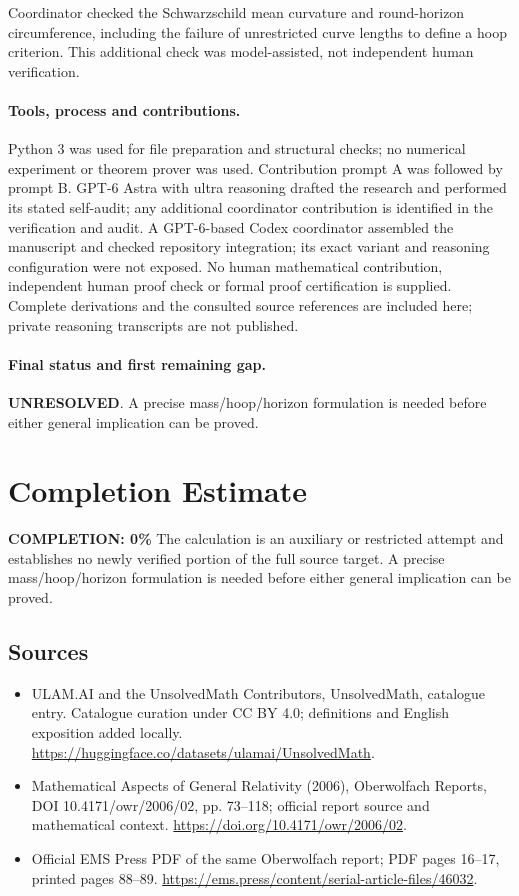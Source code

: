 \documentclass[11pt]{article}
\begin{document}
Coordinator checked the Schwarzschild mean curvature and round-horizon circumference, including the failure of unrestricted curve lengths to define a hoop criterion. This additional check was model-assisted, not independent human verification.

\paragraph{Tools, process and contributions.}
Python 3 was used for file preparation and structural checks; no numerical experiment or theorem prover was used. Contribution prompt A was followed by prompt B. GPT-6 Astra with ultra reasoning drafted the research and performed its stated self-audit; any additional coordinator contribution is identified in the verification and audit. A GPT-6-based Codex coordinator assembled the manuscript and checked repository integration; its exact variant and reasoning configuration were not exposed. No human mathematical contribution, independent human proof check or formal proof certification is supplied. Complete derivations and the consulted source references are included here; private reasoning transcripts are not published.

\paragraph{Final status and first remaining gap.}
\textbf{UNRESOLVED}. A precise mass/hoop/horizon formulation is needed before either general implication can be proved.

\section{Completion Estimate}
\noindent\textbf{COMPLETION: 0\%}
The calculation is an auxiliary or restricted attempt and establishes no newly verified portion of the full source target. A precise mass/hoop/horizon formulation is needed before either general implication can be proved.

\subsection{Sources}
\begin{itemize}
\item[\hypertarget{source:statement:1}{S1}] ULAM.AI and the UnsolvedMath Contributors, UnsolvedMath, catalogue entry. Catalogue curation under CC BY 4.0; definitions and English exposition added locally.
\url{https://huggingface.co/datasets/ulamai/UnsolvedMath}.
\item[\hypertarget{source:statement:2}{S2}] Mathematical Aspects of General Relativity (2006), Oberwolfach Reports, DOI 10.4171/owr/2006/02, pp. 73--118; official report source and mathematical context.
\url{https://doi.org/10.4171/owr/2006/02}.
\item[\hypertarget{source:statement:3}{S3}] Official EMS Press PDF of the same Oberwolfach report; PDF pages 16--17, printed pages 88--89.
\url{https://ems.press/content/serial-article-files/46032}.
\end{itemize}
\label{end:statement}
\end{document}
